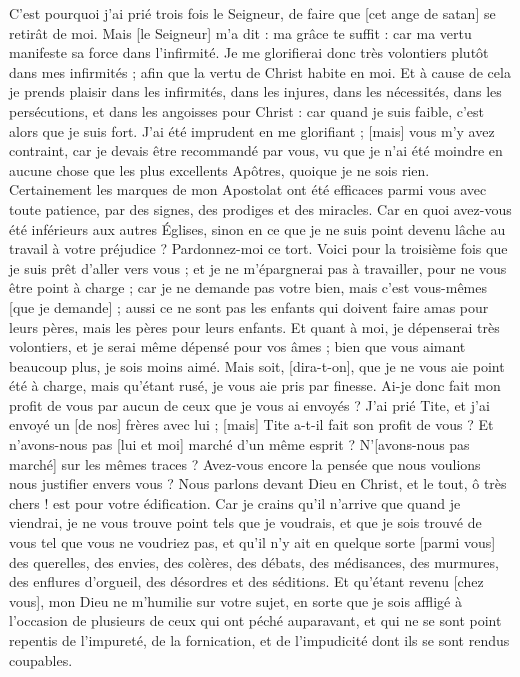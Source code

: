 \begin{multicols}{2}
C'est pourquoi j'ai prié trois fois le Seigneur, de faire que [cet ange de satan] se retirât de moi.
Mais [le Seigneur] m'a dit : ma grâce te suffit : car ma vertu manifeste sa force dans l'infirmité. Je me glorifierai donc très volontiers plutôt dans mes infirmités ; afin que la vertu de Christ habite en moi.
Et à cause de cela je prends plaisir dans les infirmités, dans les injures, dans les nécessités, dans les persécutions, et dans les angoisses pour Christ : car quand je suis faible, c'est alors que je suis fort.
J'ai été imprudent en me glorifiant ; [mais] vous m'y avez contraint, car je devais être recommandé par vous, vu que je n'ai été moindre en aucune chose que les plus excellents Apôtres, quoique je ne sois rien.
Certainement les marques de mon Apostolat ont été efficaces parmi vous avec toute patience, par des signes, des prodiges et des miracles.
Car en quoi avez-vous été inférieurs aux autres Églises, sinon en ce que je ne suis point devenu lâche au travail à votre préjudice ? Pardonnez-moi ce tort.
Voici pour la troisième fois que je suis prêt d'aller vers vous ; et je ne m'épargnerai pas à travailler, pour ne vous être point à charge ; car je ne demande pas votre bien, mais c'est vous-mêmes [que je demande] ; aussi ce ne sont pas les enfants qui doivent faire amas pour leurs pères, mais les pères pour leurs enfants.
Et quant à moi, je dépenserai très volontiers, et je serai même dépensé pour vos âmes ; bien que vous aimant beaucoup plus, je sois moins aimé.
Mais soit, [dira-t-on], que je ne vous aie point été à charge, mais qu'étant rusé, je vous aie pris par finesse.
Ai-je donc fait mon profit de vous par aucun de ceux que je vous ai envoyés ?
J'ai prié Tite, et j'ai envoyé un [de nos] frères avec lui ; [mais] Tite a-t-il fait son profit de vous ? Et n'avons-nous pas [lui et moi] marché d'un même esprit ? N'[avons-nous pas marché] sur les mêmes traces ?
Avez-vous encore la pensée que nous voulions nous justifier envers vous ? Nous parlons devant Dieu en Christ, et le tout, ô très chers ! est pour votre édification.
Car je crains qu'il n'arrive que quand je viendrai, je ne vous trouve point tels que je voudrais, et que je sois trouvé de vous tel que vous ne voudriez pas, et qu'il n'y ait en quelque sorte [parmi vous] des querelles, des envies, des colères, des débats, des médisances, des murmures, des enflures d'orgueil, des désordres et des séditions.
Et qu'étant revenu [chez vous], mon Dieu ne m'humilie sur votre sujet, en sorte que je sois affligé à l'occasion de plusieurs de ceux qui ont péché auparavant, et qui ne se sont point repentis de l'impureté, de la fornication, et de l'impudicité dont ils se sont rendus coupables.

\end{multicols}
